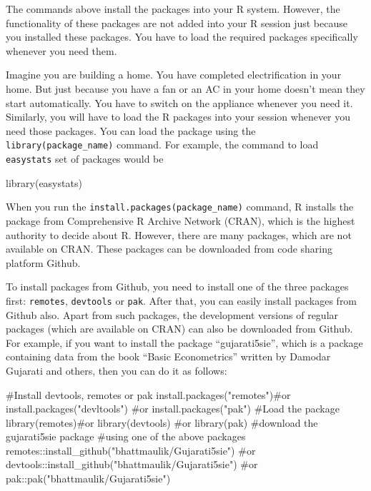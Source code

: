 \documentclass[
  letterpaper,
  paper =a4,
  twoside,
  openright,
  headsepline,
  footsepline,
  listof = totocnumbered,
  chapterprefix = true,
  firstiscover]{scrbook}
\newenvironment{Shaded}{\begin{snugshade}}{\end{snugshade}}
\newcommand{\CommentTok}[1]{\textcolor[rgb]{0.37,0.37,0.37}{#1}}
\newcommand{\FunctionTok}[1]{\textcolor[rgb]{0.28,0.35,0.67}{#1}}
\newcommand{\NormalTok}[1]{\textcolor[rgb]{0.00,0.23,0.31}{#1}}
\newcommand{\SpecialCharTok}[1]{\textcolor[rgb]{0.37,0.37,0.37}{#1}}
\newcommand{\StringTok}[1]{\textcolor[rgb]{0.13,0.47,0.30}{#1}}
\begin{document}
The commands above install the packages into your R system. However, the
functionality of these packages are not added into your R session just
because you installed these packages. You have to load the required
packages specifically whenever you need them.

Imagine you are building a home. You have completed electrification in
your home. But just because you have a fan or an AC in your home doesn't
mean they start automatically. You have to switch on the appliance
whenever you need it. Similarly, you will have to load the R packages
into your session whenever you need those packages. You can load the
package using the \texttt{library(package\_name)} command. For example,
the command to load \texttt{easystats} set of packages would be

\begin{Shaded}
\begin{Highlighting}[numbers=left,,]
\FunctionTok{library}\NormalTok{(easystats)}
\end{Highlighting}
\end{Shaded}

When you run the \texttt{install.packages(package\_name)} command, R
installs the package from Comprehensive R Archive Network (CRAN), which
is the highest authority to decide about R. However, there are many
packages, which are not available on CRAN. These packages can be
downloaded from code sharing platform Github.

To install packages from Github, you need to install one of the three
packages first: \texttt{remotes}, \texttt{devtools} or \texttt{pak}.
After that, you can easily install packages from Github also. Apart from
such packages, the development versions of regular packages (which are
available on CRAN) can also be downloaded from Github. For example, if
you want to install the package ``gujarati5sie'', which is a package
containing data from the book ``Basic Econometrics'' written by Damodar
Gujarati and others, then you can do it as follows:

\begin{Shaded}
\begin{Highlighting}[numbers=left,,]
\CommentTok{\#Install devtools, remotes or pak}
\FunctionTok{install.packages}\NormalTok{(}\StringTok{"remotes"}\NormalTok{)}\CommentTok{\#or install.packages("devltools")}
\CommentTok{\#or install.packages("pak")}
\CommentTok{\#Load the package}
\FunctionTok{library}\NormalTok{(remotes)}\CommentTok{\#or library(devtools) }
\CommentTok{\#or library(pak)}
\CommentTok{\#download the gujarati5sie package }
\CommentTok{\#using one of the above packages}
\NormalTok{remotes}\SpecialCharTok{::}\FunctionTok{install\_github}\NormalTok{(}\StringTok{"bhattmaulik/Gujarati5sie"}\NormalTok{)}
\CommentTok{\#or devtools::install\_github("bhattmaulik/Gujarati5sie") }
\CommentTok{\#or pak::pak("bhattmaulik/Gujarati5sie")}
\end{Highlighting}
\end{Shaded}
\end{document}
